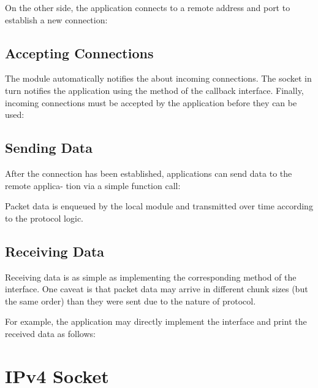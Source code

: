 On the other side, the application connects to a remote address and port to
establish a new connection:


\subsection*{Accepting Connections}

The  module automatically notifies the  about
incoming connections. The socket in turn notifies the application using the
 method of the callback interface. Finally,
incoming  connections must be accepted by the application before
they can be used:


\subsection*{Sending Data}

After the connection has been established, applications can send data to the
remote applica- tion via a simple function call:


Packet data is enqueued by the local  module and transmitted over
time according to the protocol logic.

\subsection*{Receiving Data}

Receiving data is as simple as implementing the corresponding method of the
 interface. One caveat is that packet data may
arrive in different chunk sizes (but the same order) than they were sent due to
the nature of  protocol.

For example, the application may directly implement the
 interface and print the received data as
follows:


\section{IPv4 Socket}
\label{sec:sockets:ipv4-socket}

